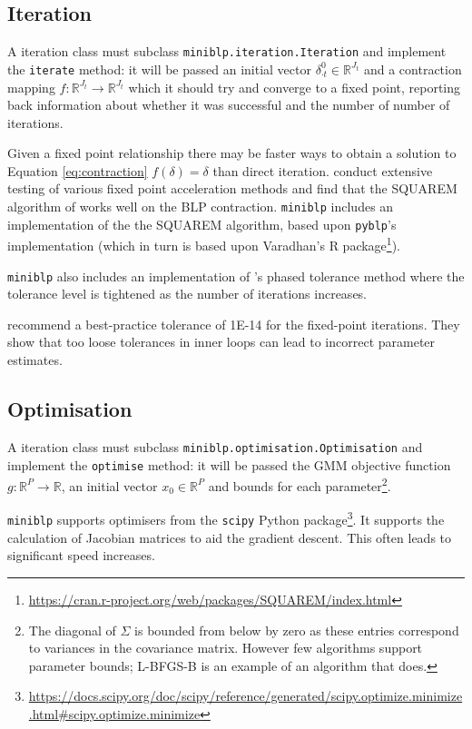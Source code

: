 \documentclass[parskip=half]{scrartcl}
\newcommand{\code}[1]{\texttt{#1}}
\begin{document}
\subsection{Iteration}

A iteration class must subclass \code{miniblp.iteration.Iteration} and implement the \code{iterate} method: it will be passed an initial vector \(\delta_{\cdot t}^0 \in \mathbb{R}^{J_t}\) and a contraction mapping \(f: \mathbb{R}^{J_t} \to \mathbb{R}^{J_t}\) which it should try and converge to a fixed point, reporting back information about whether it was successful and the number of number of iterations.

Given a fixed point relationship there may be faster ways to obtain a solution to Equation \eqref{eq:contraction} \(f(\delta) = \delta\) than direct iteration.
\cite{reynaerts2012enhancing} conduct extensive testing of various fixed point acceleration methods and find that the SQUAREM algorithm of \cite{varadhan2008simple} works well on the BLP contraction. \code{miniblp} includes an implementation of the the SQUAREM algorithm, based upon \code{pyblp}'s implementation (which in turn is based upon Varadhan's R package\footnote{\url{https://cran.r-project.org/web/packages/SQUAREM/index.html}}).

\code{miniblp} also includes an implementation of \cite{nevo2000practitioner}'s phased tolerance method where the tolerance level is tightened as the number of iterations increases.

\cite{dube2012improving} recommend a best-practice tolerance of 1E-14 for the fixed-point iterations. They show that too loose tolerances in inner loops can lead to incorrect parameter estimates.

\subsection{Optimisation}

A iteration class must subclass \code{miniblp.optimisation.Optimisation} and implement the \code{optimise} method: it will be passed the GMM objective function \(g: \mathbb{R}^P \to \mathbb{R} \), an initial vector \(x_0 \in \mathbb{R}^P\) and bounds for each parameter\footnote{The diagonal of \(\Sigma\) is bounded from below by zero as these entries correspond to variances in the covariance matrix. However few algorithms support parameter bounds; L-BFGS-B is an example of an algorithm that does.}.

\code{miniblp} supports optimisers from the \code{scipy} Python package\footnote{\url{https://docs.scipy.org/doc/scipy/reference/generated/scipy.optimize.minimize.html\#scipy.optimize.minimize}}. It supports the calculation of Jacobian matrices to aid the gradient descent. This often leads to significant speed increases.
\end{document}

